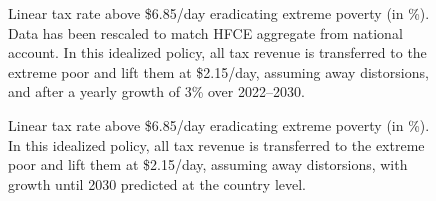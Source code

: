 \begin{figure}[!htb]
  \caption[Anti-extreme-poverty tax above \$6.85/day after 3\% growth (HFCE-scaled).]{Linear tax rate above \$6.85/day eradicating extreme poverty (in \%). Data has been rescaled to match HFCE aggregate from national account. In this idealized policy, all tax revenue is transferred to the extreme poor and lift them at \$2.15/day, assuming away distorsions, and after a yearly growth of 3\% over 2022--2030. 
  }\label{fig:s_antipoverty_2_tax_7_average}
\end{figure}

\begin{figure}[!htb]
  \caption[Anti-extreme-poverty tax above \$6.85/day after 3\% growth (HFCE-scaled).]{Linear tax rate above \$6.85/day eradicating extreme poverty (in \%). In this idealized policy, all tax revenue is transferred to the extreme poor and lift them at \$2.15/day, assuming away distorsions, with growth until 2030 predicted at the country level. 
  }\label{fig:antipoverty_2_tax_7_reg}
\end{figure}

